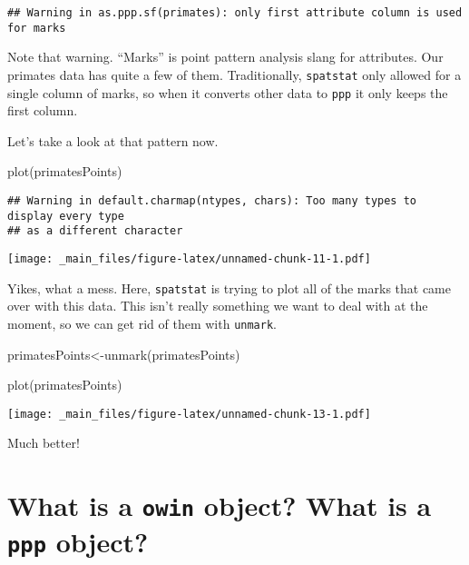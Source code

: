 \documentclass[
]{book}
\newenvironment{Shaded}{\begin{snugshade}}{\end{snugshade}}
\newcommand{\FunctionTok}[1]{\textcolor[rgb]{0.00,0.00,0.00}{#1}}
\newcommand{\NormalTok}[1]{#1}
\newcommand{\OtherTok}[1]{\textcolor[rgb]{0.56,0.35,0.01}{#1}}
\begin{document}
\begin{verbatim}
## Warning in as.ppp.sf(primates): only first attribute column is used for marks
\end{verbatim}

Note that warning. ``Marks'' is point pattern analysis slang for attributes. Our primates data has quite a few of them. Traditionally, \texttt{spatstat} only allowed for a single column of marks, so when it converts other data to \texttt{ppp} it only keeps the first column.

Let's take a look at that pattern now.

\begin{Shaded}
\begin{Highlighting}[]
\FunctionTok{plot}\NormalTok{(primatesPoints)}
\end{Highlighting}
\end{Shaded}

\begin{verbatim}
## Warning in default.charmap(ntypes, chars): Too many types to display every type
## as a different character
\end{verbatim}

\texttt{[image: \_main\_files/figure-latex/unnamed-chunk-11-1.pdf]}

Yikes, what a mess. Here, \texttt{spatstat} is trying to plot all of the marks that came over with this data. This isn't really something we want to deal with at the moment, so we can get rid of them with \texttt{unmark}.

\begin{Shaded}
\begin{Highlighting}[]
\NormalTok{primatesPoints}\OtherTok{\textless{}{-}}\FunctionTok{unmark}\NormalTok{(primatesPoints)}
\end{Highlighting}
\end{Shaded}

\begin{Shaded}
\begin{Highlighting}[]
\FunctionTok{plot}\NormalTok{(primatesPoints)}
\end{Highlighting}
\end{Shaded}

\texttt{[image: \_main\_files/figure-latex/unnamed-chunk-13-1.pdf]}

Much better!

\hypertarget{what-is-a-owin-object-what-is-a-ppp-object}{%
\section{\texorpdfstring{What is a \texttt{owin} object? What is a \texttt{ppp} object?}{What is a owin object? What is a ppp object?}}\label{what-is-a-owin-object-what-is-a-ppp-object}}
\end{document}
